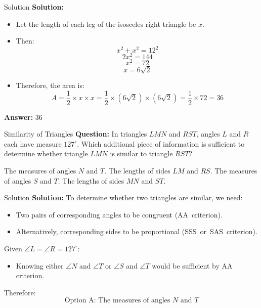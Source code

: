 \documentclass{beamer}
\begin{document}
\begin{frame}{Solution}
\textbf{Solution:}
\begin{itemize}
    \item Let the length of each leg of the isosceles right triangle be \( x \).
    \item Then:
    \[
    x^2 + x^2 = 12^2
    \]
    \[
    2x^2 = 144
    \]
    \[
    x^2 = 72
    \]
    \[
    x = 6\sqrt{2}
    \]
    \item Therefore, the area is:
    \[
    A = \frac{1}{2} \times x \times x = \frac{1}{2} \times (6\sqrt{2}) \times (6\sqrt{2}) = \frac{1}{2} \times 72 = 36
    \]
\end{itemize}
\textbf{Answer:} \( \boxed{36} \)
\end{frame}


\begin{frame}{Similarity of Triangles}
\textbf{Question:}
In triangles \(LMN\) and \(RST\), angles \(L\) and \(R\) each have measure \(127^\circ\). Which additional piece of information is sufficient to determine whether triangle \(LMN\) is similar to triangle \(RST\)?
\begin{choices}
\choice The measures of angles \(N\) and \(T\).
\choice The lengths of sides \(LM\) and \(RS\).
\choice The measures of angles \(S\) and \(T\).
\choice The lengths of sides \(MN\) and \(ST\).
\end{choices}
\end{frame}


\begin{frame}{Solution}
\textbf{Solution:}
To determine whether two triangles are similar, we need:
\begin{itemize}
    \item Two pairs of corresponding angles to be congruent (AA~criterion).
    \item Alternatively, corresponding sides to be proportional (SSS~or~SAS~criterion).
\end{itemize}
Given \( \angle L = \angle R = 127^\circ \):
\begin{itemize}
    \item Knowing either \( \angle N \) and \( \angle T \) or \( \angle S \) and \( \angle T \) would be sufficient by AA criterion.
\end{itemize}
Therefore:
\[
\boxed{\text{Option A: The measures of angles } N \text{ and } T}
\]
\end{frame}
\end{document}
